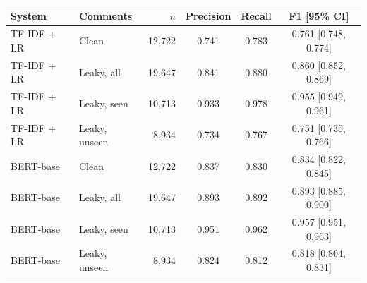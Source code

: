 \begin{tabular}{llrccc}
\toprule
System & Comments & $n$ & Precision & Recall & F1 [95\% CI] \\
\midrule
TF-IDF + LR & Clean & 12,722 & 0.741 & 0.783 & 0.761 [0.748, 0.774] \\
TF-IDF + LR & Leaky, all & 19,647 & 0.841 & 0.880 & 0.860 [0.852, 0.869] \\
TF-IDF + LR & Leaky, seen & 10,713 & 0.933 & 0.978 & 0.955 [0.949, 0.961] \\
TF-IDF + LR & Leaky, unseen & 8,934 & 0.734 & 0.767 & 0.751 [0.735, 0.766] \\
\midrule
BERT-base & Clean & 12,722 & 0.837 & 0.830 & 0.834 [0.822, 0.845] \\
BERT-base & Leaky, all & 19,647 & 0.893 & 0.892 & 0.893 [0.885, 0.900] \\
BERT-base & Leaky, seen & 10,713 & 0.951 & 0.962 & 0.957 [0.951, 0.963] \\
BERT-base & Leaky, unseen & 8,934 & 0.824 & 0.812 & 0.818 [0.804, 0.831] \\
\bottomrule
\end{tabular}

